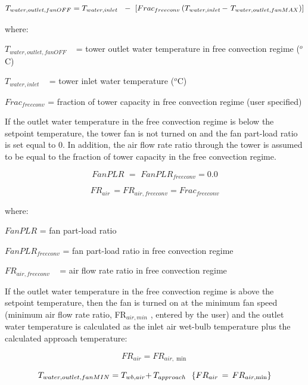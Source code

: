 \begin{equation}
{T_{water,outlet,fanOFF}} = {T_{water,inlet}}\,\,\,\, - \,\,\left[ {Fra{c_{freeconv}}\left( {{T_{water,inlet}}\,{\rm{ - }}\,\,{T_{water,outlet,fanMAX}}} \right)} \right]
\end{equation}

where:

\({T_{water,outlet,fanOFF}}\) ~ = tower outlet water temperature in free convection regime (\(^{o}\)C)

\({T_{water,inlet}}\) ~ = tower inlet water temperature (\(^{o}\)C)

\(Fra{c_{freeconv}}\) = fraction of tower capacity in free convection regime (user specified)

If the outlet water temperature in the free convection regime is below the setpoint temperature, the tower fan is not turned on and the fan part-load ratio is set equal to 0. In addition, the air flow rate ratio through the tower is assumed to be equal to the fraction of tower capacity in the free convection regime.

\begin{equation}
FanPLR\,\, = \,\,FanPL{R_{freeconv}} = 0.0
\end{equation}

\begin{equation}
F{R_{air}}\, = F{R_{air,freeconv}} = Fra{c_{freeconv}}
\end{equation}

where:

\(FanPLR\) = fan part-load ratio

\(FanPL{R_{freeconv}}\) = fan part-load ratio in free convection regime

\(F{R_{air,freeconv}}\) ~ = air flow rate ratio in free convection regime

If the outlet water temperature in the free convection regime is above the setpoint temperature, then the fan is turned on at the minimum fan speed (minimum air flow rate ratio, FR\(_{air,min}\) , entered by the user) and the outlet water temperature is calculated as the inlet air wet-bulb temperature plus the calculated approach temperature:

\begin{equation}
F{R_{air}} = F{R_{air,\min }}
\end{equation}

\begin{equation}
{T_{water,outlet,fanMIN}} = {T_{wb,air}}{\rm{ + }}\,{T_{approach}}\,\,\,\,\{ F{R_{air}}\, = \,F{R_{air,\min }}\}
\end{equation}

